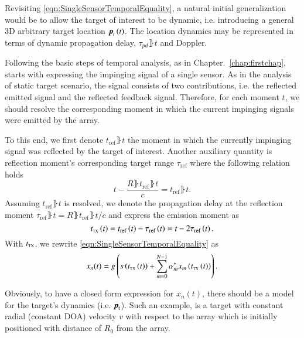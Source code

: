 Revisiting \eqref{eqn:SingleSensorTemporalEquality}, a natural initial generalization would be to allow the target of interest to be dynamic, i.e. introducing a general 3D arbitrary target location $\boldsymbol{p}_{t}\left({t}\right)$.
The location dynamics may be represented in terms of dynamic propagation delay, $\tau_{pd}\rBrace{t}$ and Doppler.
\par
Following the basic steps of temporal analysis, as in Chapter.~\ref{chap:firstchap}, starts with expressing the impinging signal of a single sensor.
As in the analysis of static target scenario, the signal consists of two contributions, i.e. the reflected emitted signal and the reflected feedback signal.
Therefore, for each moment $t$, we should resolve the corresponding moment in which the current impinging signals were emitted by the array.
\par
To this end, we first denote $t_{\text{ref}}\rBrace{t}$ the moment in which the currently impinging signal was reflected by the target of interest.
Another auxiliary quantity is reflection moment's corresponding target range $\tau_{\text{ref}}$ where the following relation holds
\begin{equation}
\label{eq_tRef_relation}
    t-\frac{R\rBrace{t_{\text{ref}}\rBrace{t}}}{c} = t_{\text{ref}}\rBrace{t}.
\end{equation}
Assuming $t_{\text{ref}}\rBrace{t}$ is resolved, we denote the propagation delay at the reflection moment $\tau_{\text{ref}}\rBrace{t} = R\rBrace{t_{\text{ref}}\rBrace{t}}/c$ and express the emission moment as
\begin{equation}
\label{eq_tTX}
    t_{\text{\tiny{TX}}}\left({t}\right) 
    = 
    t_{\text{ref}}\left({t}\right) - \tau_{\text{ref}}\left({t}\right) 
    =
    t - 2\tau_{\text{ref}}\left({t}\right).
\end{equation}
With $t_{\text{\tiny{TX}}}$, we rewrite \eqref{eqn:SingleSensorTemporalEquality} as
\begin{equation}
    \label{eq_fut_dyn_temp}
    x_{n}(t) = g\left({s\left({t_{\text{\tiny{TX}}}\left({t}\right)}\right)
    +\sum_{m=0}^{N-1}{\alpha^{*}_{m}x_{m}\left({t_{\text{\tiny{TX}}}\left({t}\right)}\right)}}\right).
\end{equation}
\par
Obviously, to have a closed form expression for $x_{n}(t)$, there should be a model for the target's dynamics (i.e. $\boldsymbol{p}_{\text{t}}{}$).
Such an example, is a target with constant radial (constant DOA) velocity $v$ with respect to the array which is initially positioned with distance of $R_{0}$ from the array.
